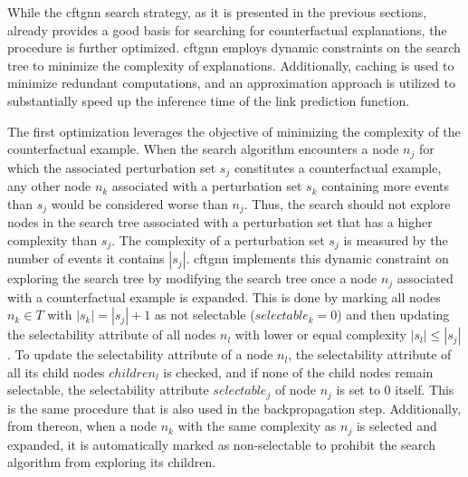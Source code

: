 While the \gls{cftgnn} search strategy, as it is presented in the previous sections, already provides a good basis for searching for counterfactual explanations, the procedure is further optimized. \gls{cftgnn} employs dynamic constraints on the search tree to minimize the complexity of explanations. Additionally, caching is used to minimize redundant computations, and an approximation approach is utilized to substantially speed up the inference time of the link prediction function.

The first optimization leverages the objective of minimizing the complexity of the counterfactual example. When the search algorithm encounters a node $n_j$ for which the associated perturbation set $s_j$ constitutes a counterfactual example, any other node $n_k$ associated with a perturbation set $s_k$ containing more events than $s_j$ would be considered worse than $n_j$. Thus, the search should not explore nodes in the search tree associated with a perturbation set that has a higher complexity than $s_j$. The complexity of a perturbation set $s_j$ is measured by the number of events it contains $|s_j|$. \gls{cftgnn} implements this dynamic constraint on exploring the search tree by modifying the search tree once a node $n_j$ associated with a counterfactual example is expanded. This is done by marking all nodes $n_k \in T$ with $|s_k| = |s_j| + 1$ as not selectable ($selectable_k = 0$) and then updating the selectability attribute of all nodes $n_l$ with lower or equal complexity $|s_l| \leq |s_j|$. To update the selectability attribute of a node $n_l$, the selectability attribute of all its child nodes $children_l$ is checked, and if none of the child nodes remain selectable, the selectability attribute $selectable_j$ of node $n_j$ is set to $0$ itself. This is the same procedure that is also used in the backpropagation step.
Additionally, from thereon, when a node $n_k$ with the same complexity as $n_j$ is selected and expanded, it is automatically marked as non-selectable to prohibit the search algorithm from exploring its children.

